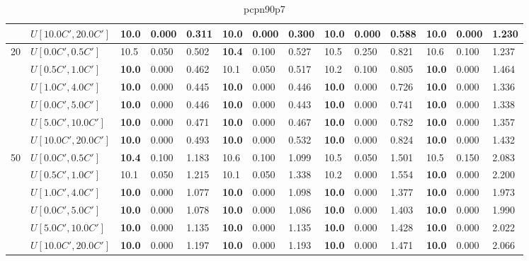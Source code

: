 \begin{table}[h]
{\begin{tabular}{|l|l||l|l|l||l|l|l||l|l|l||l|l|l|}
       & $U[10.0C',20.0C']$ & \textbf{10.0} & 0.000 & 0.311 & \textbf{10.0} & 0.000 & 0.300 & \textbf{10.0} & 0.000 & 0.588 & \textbf{10.0} & 0.000 & 1.230 \\
      \hline\hline
      \multirow{6}{*}{20} & $U[0.0C',0.5C']$ & 10.5 & 0.050 & 0.502 & \textbf{10.4} & 0.100 & 0.527 & 10.5 & 0.250 & 0.821 & 10.6 & 0.100 & 1.237 \\
       & $U[0.5C',1.0C']$ & \textbf{10.0} & 0.000 & 0.462 & 10.1 & 0.050 & 0.517 & 10.2 & 0.100 & 0.805 & \textbf{10.0} & 0.000 & 1.464 \\
       & $U[1.0C',4.0C']$ & \textbf{10.0} & 0.000 & 0.445 & \textbf{10.0} & 0.000 & 0.446 & \textbf{10.0} & 0.000 & 0.726 & \textbf{10.0} & 0.000 & 1.336 \\
       & $U[0.0C',5.0C']$ & \textbf{10.0} & 0.000 & 0.446 & \textbf{10.0} & 0.000 & 0.443 & \textbf{10.0} & 0.000 & 0.741 & \textbf{10.0} & 0.000 & 1.338 \\
       & $U[5.0C',10.0C']$ & \textbf{10.0} & 0.000 & 0.471 & \textbf{10.0} & 0.000 & 0.467 & \textbf{10.0} & 0.000 & 0.782 & \textbf{10.0} & 0.000 & 1.357 \\
       & $U[10.0C',20.0C']$ & \textbf{10.0} & 0.000 & 0.493 & \textbf{10.0} & 0.000 & 0.532 & \textbf{10.0} & 0.000 & 0.824 & \textbf{10.0} & 0.000 & 1.432 \\
      \hline\hline
      \multirow{6}{*}{50} & $U[0.0C',0.5C']$ & \textbf{10.4} & 0.100 & 1.183 & 10.6 & 0.100 & 1.099 & 10.5 & 0.050 & 1.501 & 10.5 & 0.150 & 2.083 \\
       & $U[0.5C',1.0C']$ & 10.1 & 0.050 & 1.215 & 10.1 & 0.050 & 1.338 & 10.2 & 0.000 & 1.554 & \textbf{10.0} & 0.000 & 2.200 \\
       & $U[1.0C',4.0C']$ & \textbf{10.0} & 0.000 & 1.077 & \textbf{10.0} & 0.000 & 1.098 & \textbf{10.0} & 0.000 & 1.377 & \textbf{10.0} & 0.000 & 1.973 \\
       & $U[0.0C',5.0C']$ & \textbf{10.0} & 0.000 & 1.078 & \textbf{10.0} & 0.000 & 1.086 & \textbf{10.0} & 0.000 & 1.403 & \textbf{10.0} & 0.000 & 1.990 \\
       & $U[5.0C',10.0C']$ & \textbf{10.0} & 0.000 & 1.135 & \textbf{10.0} & 0.000 & 1.135 & \textbf{10.0} & 0.000 & 1.428 & \textbf{10.0} & 0.000 & 2.022 \\
       & $U[10.0C',20.0C']$ & \textbf{10.0} & 0.000 & 1.197 & \textbf{10.0} & 0.000 & 1.193 & \textbf{10.0} & 0.000 & 1.471 & \textbf{10.0} & 0.000 & 2.066 \\
      \hline
      \end{tabular}
      }
      \caption{pcpn90p7}
      \label{tab:pcpn90p7}\end{table}


